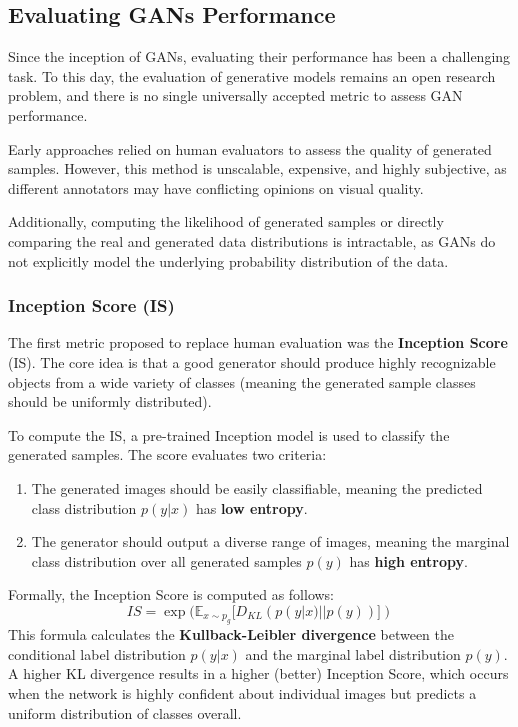 \subsection{Evaluating GANs Performance}
Since the inception of GANs, evaluating their performance has been a challenging task. To this day, the evaluation of generative models remains an open research problem, and there is no single universally accepted metric to assess GAN performance.

Early approaches relied on human evaluators to assess the quality of generated samples. However, this method is unscalable, expensive, and highly subjective, as different annotators may have conflicting opinions on visual quality.

Additionally, computing the likelihood of generated samples or directly comparing the real and generated data distributions is intractable, as GANs do not explicitly model the underlying probability distribution of the data.

\subsubsection{Inception Score (IS)}
The first metric proposed to replace human evaluation was the \textbf{Inception Score} (IS). The core idea is that a good generator should produce highly recognizable objects from a wide variety of classes (meaning the generated sample classes should be uniformly distributed).

To compute the IS, a pre-trained Inception model is used to classify the generated samples. The score evaluates two criteria:
\begin{enumerate}
    \item The generated images should be easily classifiable, meaning the predicted class distribution $p(y|x)$ has \textbf{low entropy}.
    \item The generator should output a diverse range of images, meaning the marginal class distribution over all generated samples $p(y)$ has \textbf{high entropy}.
\end{enumerate}

Formally, the Inception Score is computed as follows:
\begin{equation}
    IS = \exp(\mathbb{E}_{x \sim p_{g}}[D_{KL}(p(y|x) || p(y))])
\end{equation}
This formula calculates the \textbf{Kullback-Leibler divergence} between the conditional label distribution $p(y|x)$ and the marginal label distribution $p(y)$. A higher KL divergence results in a higher (better) Inception Score, which occurs when the network is highly confident about individual images but predicts a uniform distribution of classes overall.

